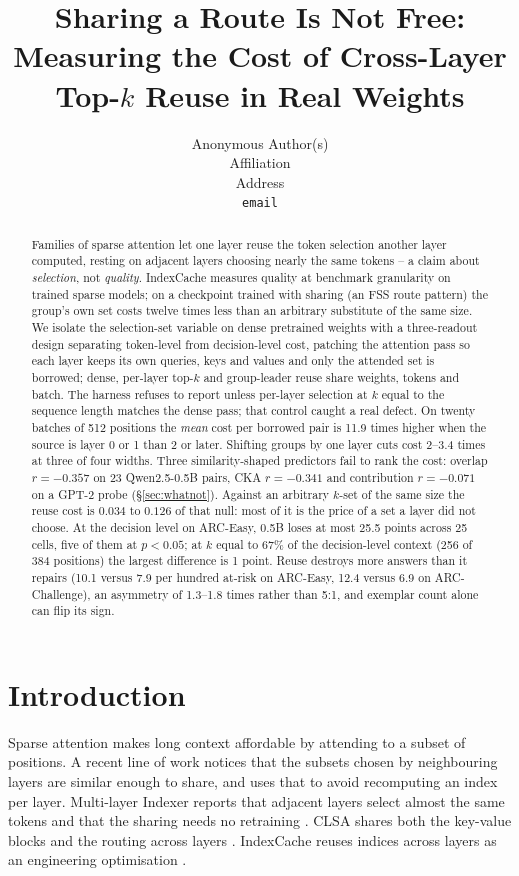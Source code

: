 \documentclass[10pt]{article}
\title{Sharing a Route Is Not Free: Measuring the Cost of Cross-Layer Top-$k$ Reuse in Real Weights}
\author{%
  Anonymous Author(s) \\
  Affiliation \\
  Address \\
  \texttt{email}
}
\begin{document}
\maketitle

\begin{abstract}
Families of sparse attention let one layer reuse the token selection another
layer computed, resting on adjacent layers choosing nearly the same tokens -- a claim about \emph{selection}, not \emph{quality}.
IndexCache \citep{indexcache} measures quality at benchmark granularity on
trained sparse models; on a checkpoint trained with sharing (an FSS route
pattern) the group's own set costs twelve times less than an arbitrary
substitute of the same size.
We isolate the selection-set variable on dense pretrained weights with a
three-readout design separating token-level from decision-level cost, patching
the attention pass so each layer keeps its own queries, keys and values and only
the attended set is borrowed; dense, per-layer top-$k$ and group-leader reuse
share weights, tokens and batch. The harness refuses to report unless per-layer
selection at $k$ equal to the sequence length matches the dense pass; that
control caught a real defect. On
twenty batches of 512 positions the \emph{mean} cost per borrowed pair is 11.9
times higher when the source is layer 0 or 1 than 2 or later. Shifting groups
by one layer cuts cost 2--3.4 times at three of four widths. Three similarity-shaped predictors fail to rank the cost: overlap $r=-0.357$ on
23 Qwen2.5-0.5B pairs, CKA $r=-0.341$ and contribution $r=-0.071$ on a GPT-2
probe (\S\ref{sec:whatnot}). Against an
arbitrary $k$-set of the same size the reuse cost is $0.034$ to $0.126$ of that
null: most of it is the price of a set a layer did not choose. At the decision level on ARC-Easy, 0.5B loses at most
25.5 points across 25 cells, five of them at $p<0.05$; at $k$ equal to 67\%
of the decision-level context (256 of 384 positions) the largest difference is
1 point. Reuse destroys more answers than it repairs (10.1 versus 7.9 per hundred
at-risk on ARC-Easy, 12.4 versus 6.9 on ARC-Challenge), an asymmetry of 1.3--1.8
times rather than 5:1, and exemplar count alone can flip its sign.
\end{abstract}

\section{Introduction}

Sparse attention makes long context affordable by attending to a subset of
positions. A recent line of work notices that the subsets chosen by
neighbouring layers are similar enough to share, and uses that to avoid
recomputing an index per layer. Multi-layer Indexer reports that adjacent layers
select almost the same tokens and that the sharing needs no retraining
\citep{mli}. CLSA shares both the key-value blocks and the routing across layers
\citep{clsa}. IndexCache reuses indices across layers as an engineering
optimisation \citep{indexcache}.
\end{document}

